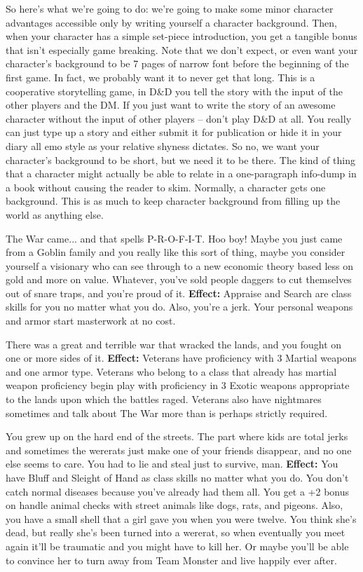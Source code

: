 So here's what we're going to do: we're going to make some minor character advantages accessible only by writing yourself a character background. Then, when your character has a simple set-piece introduction, you get a tangible bonus that isn't especially game breaking. Note that we don't expect, or even want your character's background to be 7 pages of narrow font before the beginning of the first game. In fact, we probably want it to never get that long. This is a cooperative storytelling game, in D\&D you tell the story with the input of the other players and the DM. If you just want to write the story of an awesome character without the input of other players -- don't play D\&D at all. You really can just type up a story and either submit it for publication or hide it in your diary all emo style as your relative shyness dictates. So no, we want your character's background to be short, but we need it to be there. The kind of thing that a character might actually be able to relate in a one-paragraph info-dump in a book without causing the reader to skim. Normally, a character gets one background. This is as much to keep character background from filling up the world as anything else.

\medskip{}
{The War came... and that spells P-R-O-F-I-T. Hoo boy! Maybe you just came from a Goblin family and you really like this sort of thing, maybe you consider yourself a visionary who can see through to a new economic theory based less on gold and more on value. Whatever, you've sold people daggers to cut themselves out of snare traps, and you're proud of it.}
\textbf{Effect:}{ Appraise and Search are class skills for you no matter what you do. Also, you're a jerk. Your personal weapons and armor start masterwork at no cost.}

\medskip{}
{There was a great and terrible war that wracked the lands, and you fought on one or more sides of it.}
\textbf{Effect:}{ Veterans have proficiency with 3 Martial weapons and one armor type. Veterans who belong to a class that already has martial weapon proficiency begin play with proficiency in 3 Exotic weapons appropriate to the lands upon which the battles raged. Veterans also have nightmares sometimes and talk about The War more than is perhaps strictly required.}

\medskip{}
{You grew up on the hard end of the streets. The part where kids are total jerks and sometimes the wererats just make one of your friends disappear, and no one else seems to care. You had to lie and steal just to survive, man.}
\textbf{Effect:}{ You have Bluff and Sleight of Hand as class skills no matter what you do. You don't catch normal diseases because you've already had them all. You get a +2 bonus on handle animal checks with street animals like dogs, rats, and pigeons. Also, you have a small shell that a girl gave you when you were twelve. You think she's dead, but really she's been turned into a wererat, so when eventually you meet again it'll be traumatic and you might have to kill her. Or maybe you'll be able to convince her to turn away from Team Monster and live happily ever after.}

